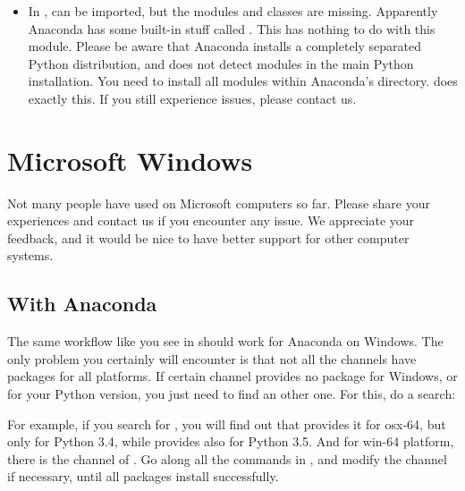 \documentclass[letterpaper,10pt,english]{sphinxmanual}
\begin{document}
\begin{itemize}
\item {} 
In ,  can be imported, but the modules and classes are
missing. Apparently Anaconda has some built-in stuff called . This
has nothing to do with this module. Please be aware that Anaconda installs a
completely separated Python distribution, and does not detect modules in the
main Python installation. You need to install all modules within Anaconda’s
directory.  does exactly this. If you still
experience issues, please contact us.

\end{itemize}


\section{Microsoft Windows}
\label{\detokenize{index:microsoft-windows}}
Not many people have used  on Microsoft computers so far. Please share
your experiences and contact us if you encounter any issue. We appreciate
your feedback, and it would be nice to have better support for other computer
systems.


\subsection{With Anaconda}
\label{\detokenize{index:with-anaconda}}
The same workflow like you see in  should work for
Anaconda on Windows. The only problem you certainly will encounter is that not
all the channels have packages for all platforms. If certain channel provides
no package for Windows, or for your Python version, you just need to find an
other one. For this, do a search:

%
\begin{sphinxVerbatim}[commandchars=\\\{\}]
     
\end{sphinxVerbatim}

For example, if you search for , you will find out that 
provides it for osx-64, but only for Python 3.4, while  provides
also for Python 3.5. And for win-64 platform, there is the channel of
. Go along all the commands in , and
modify the channel if necessary, until all packages install successfully.
\end{document}
